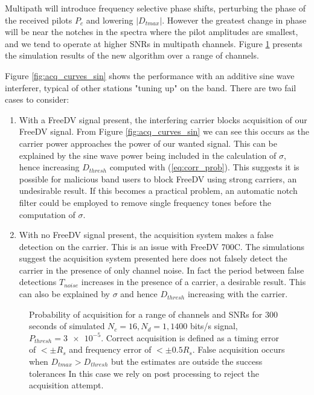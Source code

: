 \documentclass{article}
\begin{document}
Multipath will introduce frequency selective phase shifts, perturbing the phase of the received pilots $P_c$ and lowering $|D_{tmax}|$.  However the greatest change in phase will be near the notches in the spectra where the pilot amplitudes are smallest, and we tend to operate at higher SNRs in multipath channels. Figure \ref{fig:acq_curves} presents the simulation results of the new algorithm over a range of channels.

Figure \ref{fig:acq_curves_sin} shows the performance with an additive sine wave interferer, typical of other stations "tuning up" on the band.  There are two fail cases to consider:
\begin{enumerate}
\item With a FreeDV signal present, the interfering carrier blocks acquisition of our FreeDV signal.  From Figure \ref{fig:acq_curves_sin} we can see this occurs as the carrier power approaches the power of our wanted signal.  This can be explained by the sine wave power being included in the calculation of $\sigma$, hence increasing $D_{thresh}$ computed with (\ref{eq:corr_prob}). This suggests it is possible for malicious band users to block FreeDV using strong carriers, an undesirable result.  If this becomes a practical problem, an automatic notch filter could be employed to remove single frequency tones before the computation of $\sigma$.
\item With no FreeDV signal present, the acquisition system makes a false detection on the carrier.  This is an issue with FreeDV 700C. The simulations suggest the acquisition system presented here does not falsely detect the carrier in the presence of only channel noise.  In fact the period between false detections $T_{noise}$ increases in the presence of a carrier, a desirable result.  This can also be explained by $\sigma$ and hence $D_{thresh}$ increasing with the carrier.
\end{enumerate}

\begin{figure}[H]
\caption{Probability of acquisition for a range of channels and SNRs for 300 seconds of simulated $N_c=16, N_d=1, 1400$ bits/s signal, $P_{thresh}=\num{3e-5}$. Correct acquisition is defined as a timing error of $< \pm R_s$ and frequency error of $< \pm 0.5R_s$.  False acquisition occurs when $D_{tmax} > D_{thresh}$ but the estimates are outside the success tolerances  In this case we rely on post processing to reject the acquisition attempt.}
\label{fig:acq_curves}
\begin{center}

\end{center}
\end{figure}
\end{document}

